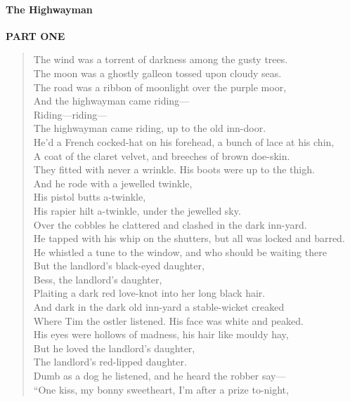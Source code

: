 \paragraph{The Highwayman}


\textbf{PART ONE}
\begin{verse}
The wind was a torrent of darkness among the gusty trees.\\
The moon was a ghostly galleon tossed upon cloudy seas.\\
The road was a ribbon of moonlight over the purple moor,\\
And the highwayman came riding---\\
Riding---riding---\\
The highwayman came riding, up to the old inn-door.\\
He'd a French cocked-hat on his forehead, a bunch of lace at his chin,\\
A coat of the claret velvet, and breeches of brown doe-skin.\\
They fitted with never a wrinkle. His boots were up to the thigh.\\
And he rode with a jewelled twinkle,\\
His pistol butts a-twinkle,\\
His rapier hilt a-twinkle, under the jewelled sky.\\
Over the cobbles he clattered and clashed in the dark inn-yard.\\
He tapped with his whip on the shutters, but all was locked and barred.\\
He whistled a tune to the window, and who should be waiting there\\
But the landlord's black-eyed daughter,\\
Bess, the landlord's daughter,\\
Plaiting a dark red love-knot into her long black hair.\\
And dark in the dark old inn-yard a stable-wicket creaked\\
Where Tim the ostler listened. His face was white and peaked.\\
His eyes were hollows of madness, his hair like mouldy hay,\\
But he loved the landlord's daughter,\\
The landlord's red-lipped daughter.\\
Dumb as a dog he listened, and he heard the robber say---\\
``One kiss, my bonny sweetheart, I'm after a prize to-night,\\

\end{verse}
